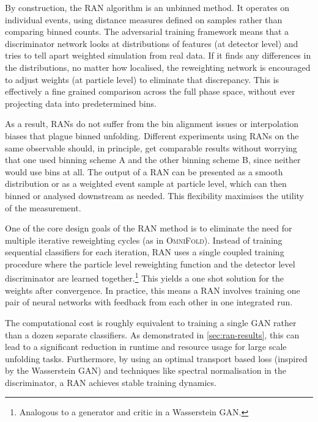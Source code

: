 {{        By construction, the RAN algorithm is an unbinned method.
        It operates on individual events, using distance measures defined on samples rather than comparing binned counts.
        The adversarial training framework means that a discriminator network looks at distributions of features (at detector level) and tries to tell apart weighted simulation from real data.
        If it finds any differences in the distributions, no matter how localised, the reweighting network is encouraged to adjust weights (at particle level) to eliminate that discrepancy.
        This is effectively a fine grained comparison across the full phase space, without ever projecting data into predetermined bins.
        
        As a result, RANs do not suffer from the bin alignment issues or interpolation biases that plague binned unfolding.
        Different experiments using RANs on the same observable should, in principle, get comparable results without worrying that one used binning scheme A and the other binning scheme B, since neither would use bins at all.
        The output of a RAN can be presented as a smooth distribution or as a weighted event sample at particle level, which can then binned or analysed downstream as needed.
        This flexibility maximises the utility of the measurement.

        One of the core design goals of the RAN method is to eliminate the need for multiple iterative reweighting cycles (as in \textsc{OmniFold}).
        Instead of training sequential classifiers for each iteration, RAN uses a single coupled training procedure where the particle level reweighting function and the detector level discriminator are learned together.\footnote{Analogous to a generator and critic in a Wasserstein GAN.}
        This yields a one shot solution for the weights after convergence.
        In practice, this means a RAN involves training one pair of neural networks with feedback from each other in one integrated run.
        
        The computational cost is roughly equivalent to training a single GAN rather than a dozen separate classifiers.
        As demonstrated in \cref{sec:ran-results}, this can lead to a significant reduction in runtime and resource usage for large scale unfolding tasks.
        Furthermore, by using an optimal transport based loss (inspired by the Wasserstein GAN) and techniques like spectral normalisation in the discriminator, a RAN achieves stable training dynamics.
        
}}
